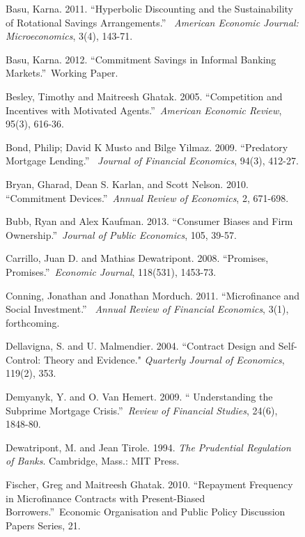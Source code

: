 \documentclass[11pt]{article}%
\begin{document}
\begin{figure}
{\begin{thebibliography}{99}
Basu, Karna. 2011. \textquotedblleft Hyperbolic Discounting
and the Sustainability of Rotational Savings Arrangements.\textquotedblright%
\ \textit{American Economic Journal: Microeconomics}, 3(4), 143-71.

\bibitem {}Basu, Karna. 2012. \textquotedblleft Commitment Savings in Informal
Banking Markets.\textquotedblright\ Working Paper.

Besley, Timothy and Maitreesh Ghatak. 2005.
\textquotedblleft Competition and Incentives with Motivated
Agents.\textquotedblright\ \textit{American Economic Review}, 95(3), 616-36.

\bibitem {}Bond, Philip; David K Musto and Bilge Yilmaz. 2009.
\textquotedblleft Predatory Mortgage Lending.\textquotedblright%
\ \textit{Journal of Financial Economics}, 94(3), 412-27.

Bryan, Gharad, Dean S. Karlan, and Scott Nelson.
2010. \textquotedblleft Commitment Devices.\textquotedblright\ \textit{Annual
Review of Economics}, 2, 671-698.

Bubb, Ryan and Alex Kaufman. 2013. \textquotedblleft Consumer
Biases and Firm Ownership.\textquotedblright\ \textit{Journal of Public
Economics}, 105, 39-57.

Carrillo, Juan D. and Mathias Dewatripont. 2008.
\textquotedblleft Promises, Promises.\textquotedblright\ \textit{Economic
Journal}, 118(531), 1453-73.

Conning, Jonathan and Jonathan Morduch. 2011.
\textquotedblleft Microfinance and Social Investment.\textquotedblright%
\ \textit{Annual Review of Financial Economics}, 3(1), forthcoming.

\bibitem {}Dellavigna, S. and U. Malmendier. 2004. \textquotedblleft Contract
Design and Self-Control: Theory and Evidence." \textit{Quarterly Journal of
Economics}, 119(2), 353.

\bibitem {}Demyanyk, Y. and O. Van Hemert. 2009. \textquotedblleft
Understanding the Subprime Mortgage Crisis.\textquotedblright\ \textit{Review
of Financial Studies}, 24(6), 1848-80.

Dewatripont, M. and Jean Tirole. 1994. \textit{The
Prudential Regulation of Banks}. Cambridge, Mass.: MIT Press.

Fischer, Greg and Maitreesh Ghatak. 2010.
\textquotedblleft Repayment Frequency in Microfinance Contracts with
Present-Biased Borrowers.\textquotedblright\ Economic Organisation and Public
Policy Discussion Papers Series, 21.


\end{thebibliography}}
\end{figure}
\end{document}
